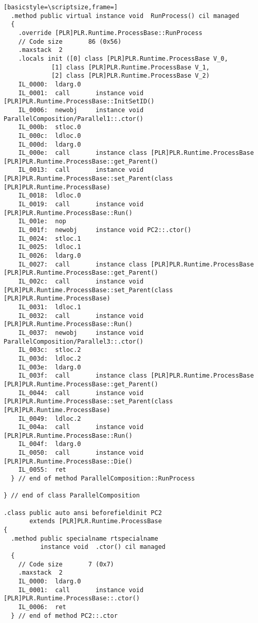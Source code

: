 \begin{lstlisting}[basicstyle=\scriptsize,frame=]
  .method public virtual instance void  RunProcess() cil managed
  {
    .override [PLR]PLR.Runtime.ProcessBase::RunProcess
    // Code size       86 (0x56)
    .maxstack  2
    .locals init ([0] class [PLR]PLR.Runtime.ProcessBase V_0,
             [1] class [PLR]PLR.Runtime.ProcessBase V_1,
             [2] class [PLR]PLR.Runtime.ProcessBase V_2)
    IL_0000:  ldarg.0
    IL_0001:  call       instance void [PLR]PLR.Runtime.ProcessBase::InitSetID()
    IL_0006:  newobj     instance void ParallelComposition/Parallel1::.ctor()
    IL_000b:  stloc.0
    IL_000c:  ldloc.0
    IL_000d:  ldarg.0
    IL_000e:  call       instance class [PLR]PLR.Runtime.ProcessBase [PLR]PLR.Runtime.ProcessBase::get_Parent()
    IL_0013:  call       instance void [PLR]PLR.Runtime.ProcessBase::set_Parent(class [PLR]PLR.Runtime.ProcessBase)
    IL_0018:  ldloc.0
    IL_0019:  call       instance void [PLR]PLR.Runtime.ProcessBase::Run()
    IL_001e:  nop
    IL_001f:  newobj     instance void PC2::.ctor()
    IL_0024:  stloc.1
    IL_0025:  ldloc.1
    IL_0026:  ldarg.0
    IL_0027:  call       instance class [PLR]PLR.Runtime.ProcessBase [PLR]PLR.Runtime.ProcessBase::get_Parent()
    IL_002c:  call       instance void [PLR]PLR.Runtime.ProcessBase::set_Parent(class [PLR]PLR.Runtime.ProcessBase)
    IL_0031:  ldloc.1
    IL_0032:  call       instance void [PLR]PLR.Runtime.ProcessBase::Run()
    IL_0037:  newobj     instance void ParallelComposition/Parallel3::.ctor()
    IL_003c:  stloc.2
    IL_003d:  ldloc.2
    IL_003e:  ldarg.0
    IL_003f:  call       instance class [PLR]PLR.Runtime.ProcessBase [PLR]PLR.Runtime.ProcessBase::get_Parent()
    IL_0044:  call       instance void [PLR]PLR.Runtime.ProcessBase::set_Parent(class [PLR]PLR.Runtime.ProcessBase)
    IL_0049:  ldloc.2
    IL_004a:  call       instance void [PLR]PLR.Runtime.ProcessBase::Run()
    IL_004f:  ldarg.0
    IL_0050:  call       instance void [PLR]PLR.Runtime.ProcessBase::Die()
    IL_0055:  ret
  } // end of method ParallelComposition::RunProcess

} // end of class ParallelComposition

.class public auto ansi beforefieldinit PC2
       extends [PLR]PLR.Runtime.ProcessBase
{
  .method public specialname rtspecialname 
          instance void  .ctor() cil managed
  {
    // Code size       7 (0x7)
    .maxstack  2
    IL_0000:  ldarg.0
    IL_0001:  call       instance void [PLR]PLR.Runtime.ProcessBase::.ctor()
    IL_0006:  ret
  } // end of method PC2::.ctor


\end{lstlisting}
